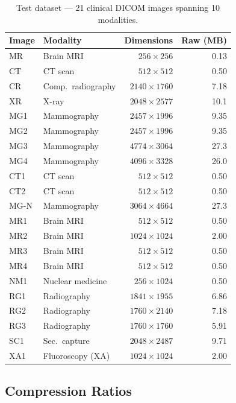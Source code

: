 \documentclass[journal]{IEEEtran}
\begin{document}
\begin{table}[htbp]
\centering
\caption{Test dataset --- 21 clinical DICOM images spanning 10 modalities.}
\label{tab:dataset}
\begin{tabular}{llrr}
\toprule
Image & Modality & Dimensions & Raw (MB) \\
\midrule
MR   & Brain MRI & $256{\times}256$ & 0.13 \\
CT   & CT scan   & $512{\times}512$ & 0.50 \\
CR   & Comp.\ radiography & $2140{\times}1760$ & 7.18 \\
XR   & X-ray & $2048{\times}2577$ & 10.1 \\
MG1  & Mammography & $2457{\times}1996$ & 9.35 \\
MG2  & Mammography & $2457{\times}1996$ & 9.35 \\
MG3  & Mammography & $4774{\times}3064$ & 27.3 \\
MG4  & Mammography & $4096{\times}3328$ & 26.0 \\
CT1  & CT scan & $512{\times}512$ & 0.50 \\
CT2  & CT scan & $512{\times}512$ & 0.50 \\
MG-N & Mammography & $3064{\times}4664$ & 27.3 \\
MR1  & Brain MRI & $512{\times}512$ & 0.50 \\
MR2  & Brain MRI & $1024{\times}1024$ & 2.00 \\
MR3  & Brain MRI & $512{\times}512$ & 0.50 \\
MR4  & Brain MRI & $512{\times}512$ & 0.50 \\
NM1  & Nuclear medicine & $256{\times}1024$ & 0.50 \\
RG1  & Radiography & $1841{\times}1955$ & 6.86 \\
RG2  & Radiography & $1760{\times}2140$ & 7.18 \\
RG3  & Radiography & $1760{\times}1760$ & 5.91 \\
SC1  & Sec.~capture     & $2048{\times}2487$ & 9.71 \\
XA1  & Fluoroscopy (XA) & $1024{\times}1024$ & 2.00 \\
\bottomrule
\end{tabular}
\end{table}

\subsection{Compression Ratios}
\end{document}

